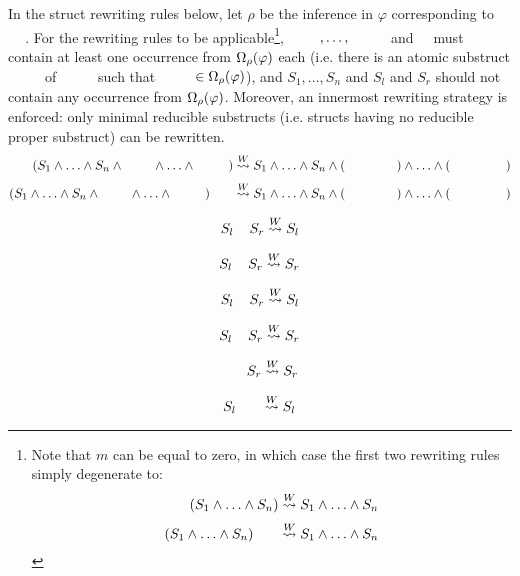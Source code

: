 \documentclass{llncs}
\begin{document}
\begin{definition}[$\normalizePlusTimesS$]
\label{definition:NormalizationPlusTimesSwap}

In the struct rewriting rules below, let $\rho$ be the inference in $\varphi$ corresponding to $\hF{\structtimes_{\rho}}$. For the rewriting rules to be applicable\footnote{
%
Note that $m$ can be equal to zero, in which case the first two rewriting rules simply degenerate to:
$$
\hF{S} \hF{\structtimes_{\rho}} (S_1 \structplus \ldots \structplus S_n) \normalizePlusTimesS  S_1 \structplus \ldots \structplus S_n 
$$
$$
(S_1 \structplus \ldots \structplus S_n) \hF{\structtimes_{\rho}} \hF{S} \normalizePlusTimesS  S_1 \structplus \ldots \structplus S_n 
$$
%
}, $\hF{S_{n+1}}, \ldots, \hF{S_{n+m}}$ and $\hF{S}$ must contain at least one occurrence from $\Omega_{\rho}(\varphi)$ each (i.e. there is an atomic substruct $\hF{S'_{n+k}}$ of $\hF{S_{n+k}}$ such that $\hF{S'_{n+k}} \in \occInference{\varphi}{\rho}$), and $S_1, \ldots, S_n$ and $S_l$ and $S_r$ should not contain any occurrence from $\Omega_{\rho}(\varphi)$. Moreover, an innermost rewriting strategy is enforced: only minimal reducible substructs (i.e. structs having no reducible proper substruct) can be rewritten.
$$
\hF{S} \hF{\structtimes_{\rho}} (S_1 \structplus \ldots \structplus S_n \structplus \hF{S_{n+1}} \structplus \ldots \structplus \hF{S_{n+m}}) \normalizePlusTimesS  S_1 \structplus \ldots \structplus S_n \structplus (\hF{S} \hF{\structtimes_{\rho}} \hF{S_{n+1}}) \structplus \ldots \structplus (\hF{S} \hF{\structtimes_{\rho}} \hF{S_{n+m}}) 
$$
$$
(S_1 \structplus \ldots \structplus S_n \structplus \hF{S_{n+1}} \structplus \ldots \structplus \hF{S_{n+m}}) \hF{\structtimes_{\rho}} \hF{S} \normalizePlusTimesS  S_1 \structplus \ldots \structplus S_n \structplus ( \hF{S_{n+1}} \hF{\structtimes_{\rho}} \hF{S}) \structplus \ldots \structplus (\hF{S_{n+m}} \hF{\structtimes_{\rho}} \hF{S}) 
$$
\begin{multicols}{4}{
$$
S_l \hF{\structtimes_{\rho}} S_r \normalizePlusTimesS  S_l
$$

$$
S_l \hF{\structtimes_{\rho}} S_r \normalizePlusTimesS  S_r
$$

$$
S_l \hF{\structplus_{\rho}} S_r \normalizePlusTimesS  S_l
$$

$$
S_l \hF{\structplus_{\rho}} S_r \normalizePlusTimesS  S_r
$$
}\end{multicols}
\begin{multicols}{2}{
$$
\hF{S} \hF{\structplus_{\rho}} S_r \normalizePlusTimesS  S_r
$$

$$
S_l \hF{\structplus_{\rho}} \hF{S} \normalizePlusTimesS  S_l
$$
}\end{multicols}
\end{definition}
\end{document}
